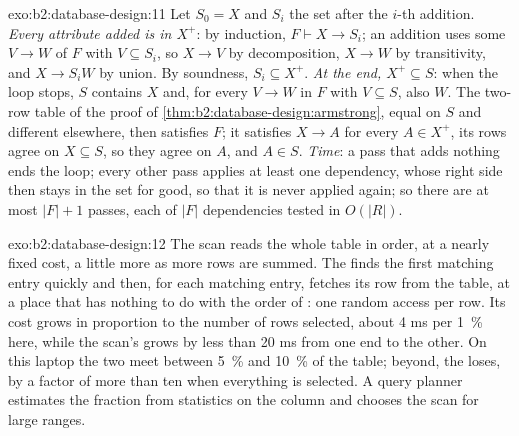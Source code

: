 \begin{solution}{exo:b2:database-design:11}
Let $S_0 = X$ and $S_i$ the set after the $i$-th addition. \emph{Every attribute added is in $X^+$}: by induction,
$F \vdash X \to S_i$; an addition uses some $V \to W$ of $F$ with $V \subseteq S_i$, so $X \to V$ by decomposition,
$X \to W$ by transitivity, and $X \to S_i W$ by union. By soundness, $S_i \subseteq X^+$. \emph{At the end, $X^+ \subseteq
S$}: when the loop stops, $S$ contains $X$ and, for every $V \to W$ in $F$ with $V \subseteq S$, also $W$. The two-row table
of the proof of \cref{thm:b2:database-design:armstrong}, equal on $S$ and different elsewhere, then satisfies $F$; it
satisfies $X \to A$ for every $A \in X^+$, its rows agree on $X \subseteq S$, so they agree on $A$, and $A \in S$.
\emph{Time}: a pass that adds nothing ends the loop; every other pass applies at least one dependency, whose right side then
stays in the set for good, so that it is never applied again; so there are at most $|F| + 1$ passes, each of
$|F|$ dependencies tested in $O(|R|)$.
\end{solution}

\begin{solution}{exo:b2:database-design:12}
The scan reads the whole table in order, at a nearly fixed cost, a little more as more rows are summed. The  finds
the first matching entry quickly and then, for each matching entry, fetches its row from the table, at a place that has
nothing to do with the order of : one random access per row. Its cost grows in proportion to the number of
rows selected, about 4 ms per 1~\% here, while the scan's grows by less than 20 ms from one end to the other. On this laptop the two meet between 5~\% and 10~\% of the table; beyond, the
 loses, by a factor of more than ten when everything is selected. A query planner estimates the fraction from
statistics on the column and chooses the scan for large ranges.
\end{solution}

